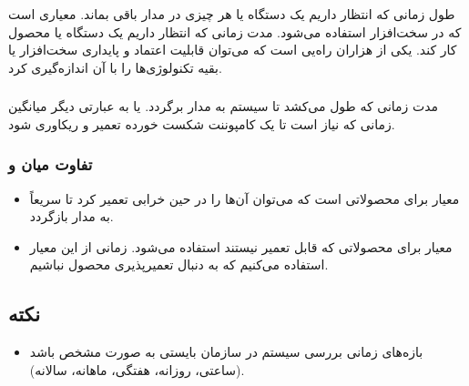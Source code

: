 \documentclass[a4paper]{article}
\begin{document}
طول زمانی که انتظار داریم یک دستگاه یا هر چیزی در مدار باقی بماند. 
معیاری است که در سخت‌افزار استفاده می‌شود. مدت زمانی که انتظار داریم یک دستگاه
یا محصول کار کند.  یکی از هزاران راه‌یی است که می‌توان قابلیت اعتماد و
پایداری سخت‌افزار یا بقیه تکنولوژی‌ها را با آن اندازه‌گیری کرد.

\subsubsection{}

مدت زمانی که طول می‌کشد تا سیستم به مدار برگردد. یا به عبارتی دیگر میانگین زمانی
که نیاز است تا یک کامپوننت شکست خورده تعمیر و ریکاوری شود.

\subsubsection{تفاوت میان  و }

\begin{itemize}
    \item معیار  برای محصولاتی است که می‌توان آن‌ها را در حین خرابی
    تعمیر کرد تا سریعاً به مدار بازگردد.
    \item معیار  برای محصولاتی که قابل تعمیر نیستند استفاده می‌شود.
    زمانی از این معیار استفاده می‌کنیم که به دنبال تعمیرپذیری محصول نباشیم.
\end{itemize}


\subsection*{نکته}

\begin{itemize}
    \item بازه‌های زمانی بررسی سیستم در سازمان بایستی به صورت مشخص باشد (ساعتی،
    روزانه، هفتگی، ماهانه، سالانه).
\end{itemize}

\newpage


\end{document}

